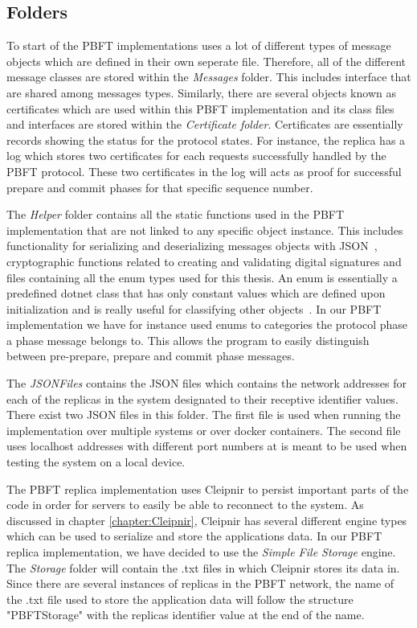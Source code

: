 \subsection{Folders}
To start of the PBFT implementations uses a lot of different types of message objects which are defined in their own seperate file. Therefore, all of the different message classes are stored within the \emph{Messages} folder. This includes interface that are shared among messages types. Similarly, there are several objects known as certificates which are used within this PBFT implementation and its class files and interfaces are stored within the \emph{Certificate folder}. Certificates are essentially records showing the status for the protocol states. For instance, the replica has a log which stores two certificates for each requests successfully handled by the PBFT protocol. These two certificates in the log will acts as proof for successful prepare and commit phases for that specific sequence number. 

The \emph{Helper} folder contains all the static functions used in the PBFT implementation that are not linked to any specific object instance. This includes functionality for serializing and deserializing messages objects with JSON~\cite{WEB:NewJSON}, cryptographic functions related to creating and validating digital signatures and files containing all the enum types used for this thesis. An enum is essentially a predefined dotnet class that has only constant values which are defined upon initialization and is really useful for classifying other objects~\cite{WEB:Enum}. In our PBFT implementation we have for instance used enums to categories the protocol phase a phase message belongs to. This allows the program to easily distinguish between pre-prepare, prepare and commit phase messages.  

The \emph{JSONFiles} contains the JSON files which contains the network addresses for each of the replicas in the system designated to their receptive identifier values. There exist two JSON files in this folder. The first file is used when running the implementation over multiple systems or over docker containers. The second file uses localhost addresses with different port numbers at is meant to be used when testing the system on a local device.

The PBFT replica implementation uses Cleipnir to persist important parts of the code in order for servers to easily be able to reconnect to the system. As discussed in chapter \autoref{chapter:Cleipnir}, Cleipnir has several different engine types which can be used to serialize and store the applications data. In our PBFT replica implementation, we have decided to use the \emph{Simple File Storage} engine. The \emph{Storage} folder will contain the .txt files in which Cleipnir stores its data in. Since there are several instances of replicas in the PBFT network, the name of the .txt file used to store the application data will follow the structure "PBFTStorage" with the replicas identifier value at the end of the name.

